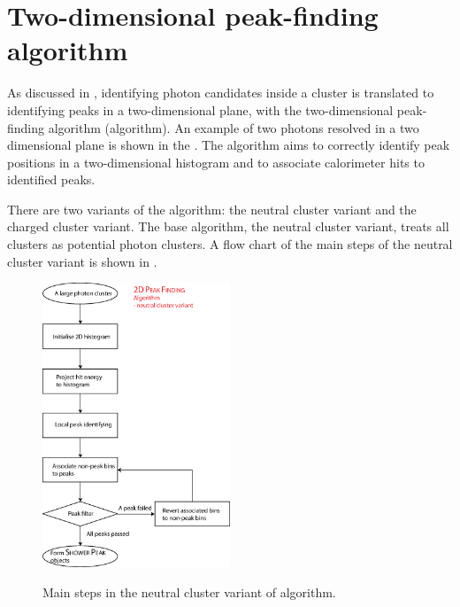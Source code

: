 \section{Two-dimensional peak-finding algorithm}
\label{sec:peakFinding}

As discussed in , identifying photon candidates inside a cluster is translated to identifying peaks in a two-dimensional plane, with the two-dimensional peak-finding algorithm (\peakFinding algorithm). An example of two photons resolved in a two dimensional plane is shown in the . The \peakFinding algorithm aims to correctly identify peak positions in a two-dimensional histogram and to associate calorimeter hits to identified peaks.

There are two variants of the \peakFinding algorithm: the neutral cluster variant and the charged cluster variant. The base algorithm, the neutral cluster variant, treats all clusters as potential photon clusters. A flow chart of the main steps of the  neutral cluster variant is shown in . 



\begin{figure}[tbph]
\centering
{\includegraphics[width=0.5\textwidth]{photon/2DpeakFinding}}
\caption[Flow chart for \peakFinding algorithm neutral cluster variant.]
{Main steps in the  neutral cluster variant of \peakFinding algorithm.}
\label{fig:photonPeakFindingFlowNeutral}
\end{figure}

